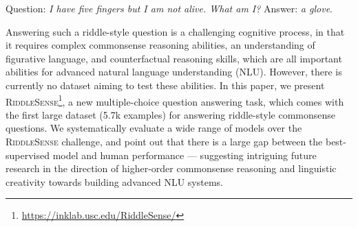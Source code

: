 
Question: \textit{I have five fingers but I am not alive.  What am I?}  Answer: \textit{a glove}. 

Answering such a riddle-style question is a challenging cognitive process, in that it requires complex commonsense reasoning abilities, an understanding of figurative language, and counterfactual reasoning skills, which are all important abilities for advanced natural language understanding (NLU).
However, there is currently no dataset aiming to test these abilities.
In this paper, we present \textsc{RiddleSense}\footnote{\url{https://inklab.usc.edu/RiddleSense/}}, a new multiple-choice question answering task,
which comes with the first large dataset (5.7k examples) for answering riddle-style commonsense questions. 
We systematically evaluate a wide range of  models over the \textsc{RiddleSense} challenge, and point out that there is a large gap between the best-supervised model and human performance --- suggesting intriguing future research in the direction of higher-order commonsense reasoning and linguistic creativity towards building advanced NLU systems. 



